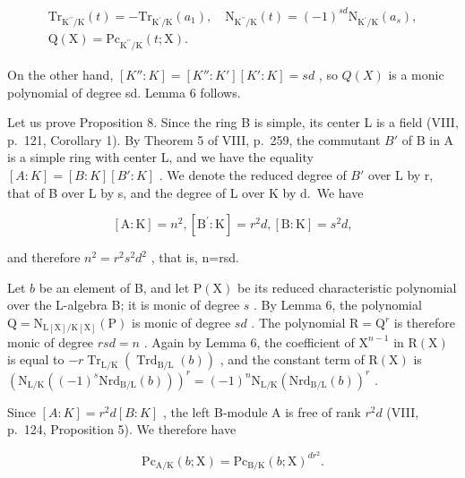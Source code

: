 \[
\begin{array}{r} \mathrm{Tr} _ {\mathrm{K} ^ {\prime \prime} / \mathrm{K}} (t) = - \mathrm{Tr} _ {\mathrm{K} ^ {\prime} / \mathrm{K}} (a _ {1}), \quad \mathrm{N} _ {\mathrm{K} ^ {\prime \prime} / \mathrm{K}} (t) = (- 1) ^ {s d} \mathrm{N} _ {\mathrm{K} ^ {\prime} / \mathrm{K}} (a _ {s}), \\ \mathrm{Q} (\mathrm{X}) = \mathrm{Pc} _ {\mathrm{K} ^ {\prime \prime} / \mathrm{K}} (t; \mathrm{X}). \end{array}
\]

On the other hand, \([K'' : K] = [K'' : K'][K' : K] = sd\) , so \(Q(X)\) is a monic polynomial of degree sd. Lemma 6 follows.

Let us prove Proposition 8. Since the ring B is simple, its center L is a field (VIII, p.~121, Corollary 1). By Theorem 5 of VIII, p.~259, the commutant \(B'\) of B in A is a simple ring with center L, and we have the equality \([A:K]=[B:K][B':K]\) . We denote the reduced degree of \(B'\) over L by r, that of B over L by s, and the degree of L over K by d.~We have

\[
[ \mathrm{A}: \mathrm{K} ] = n ^ {2}, [ \mathrm{B} ^ {\prime}: \mathrm{K} ] = r ^ {2} d, [ \mathrm{B}: \mathrm{K} ] = s ^ {2} d,
\]

and therefore \(n^{2}=r^{2}s^{2}d^{2}\) , that is, n=rsd.

Let \(b\) be an element of B, and let \(\mathrm{P}(\mathrm{X})\) be its reduced characteristic polynomial over the L-algebra B; it is monic of degree \(s\) . By Lemma 6, the polynomial \(\mathrm{Q} = \mathrm{N}_{\mathrm{L}[\mathrm{X}] / \mathrm{K}[\mathrm{X}]}(\mathrm{P})\) is monic of degree \(sd\) . The polynomial \(\mathrm{R} = \mathrm{Q}^r\) is therefore monic of degree \(rsd = n\) . Again by Lemma 6, the coefficient of \(\mathrm{X}^{n - 1}\) in \(\mathrm{R}(\mathrm{X})\) is equal to \(-r\operatorname{Tr}_{\mathrm{L} / \mathrm{K}}(\operatorname{Trd}_{\mathrm{B} / \mathrm{L}}(b))\) , and the constant term of \(\mathrm{R}(\mathrm{X})\) is \((\mathrm{N}_{\mathrm{L} / \mathrm{K}}((-1)^s\mathrm{Nrd}_{\mathrm{B} / \mathrm{L}}(b)))^r = (-1)^n\mathrm{N}_{\mathrm{L} / \mathrm{K}}(\mathrm{Nrd}_{\mathrm{B} / \mathrm{L}}(b))^r\) .

Since \([A:K]=r^{2}d[B:K]\) , the left B-module A is free of rank \(r^{2}d\) (VIII, p.~124, Proposition 5). We therefore have

\[
\mathrm{Pc} _ {\mathrm{A/K}} (b; \mathrm{X}) = \mathrm{Pc} _ {\mathrm{B/K}} (b; \mathrm{X}) ^ {d r ^ {2}}.\tag{60}
\]

